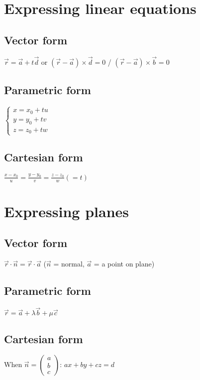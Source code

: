 \section{Expressing linear equations}

\subsection{Vector form}
$\vec{r}=\vec{a}+t\vec{d}$ or $(\vec{r}-\vec{a})\times\vec{d}=0$ / $(\vec{r}-\vec{a})\times\vec{b}=0$
\subsection{Parametric form}
$\begin{cases}
        x=x_0+tu \\
        y=y_0+tv \\
        z=z_0+tw
    \end{cases}$
\subsection{Cartesian form}
$\frac{x-x_0}{u}=\frac{y-y_0}{v}=\frac{z-z_0}{w}(=t)$

\section{Expressing planes}
\subsection{Vector form}
$\vec{r} \cdot \vec{n} = \vec{r} \cdot \vec{a}$ ($\vec{n}$ = normal, $\vec{a}$ = a point on plane)
\subsection{Parametric form}
$\vec{r}=\vec{a}+\lambda\vec{b}+\mu\vec{c}$
\subsection{Cartesian form}
When $\vec{n} = \begin{pmatrix}a\\b\\c\end{pmatrix}$: $ax+by+cz=d$

